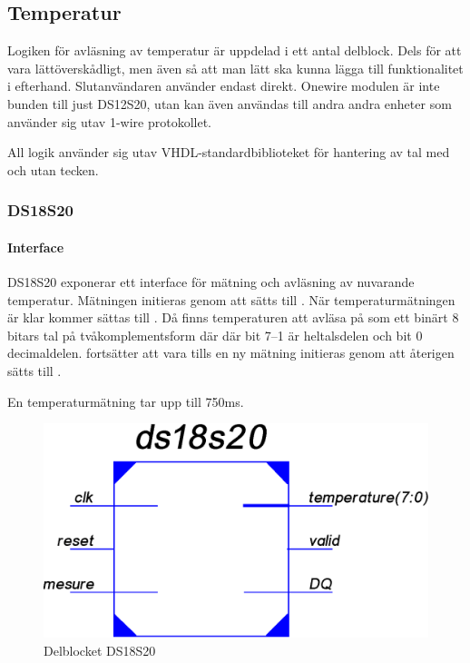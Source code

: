 
\subsection{Temperatur}\label{sec:temperatur}
Logiken för avläsning av temperatur är uppdelad i ett antal delblock. Dels för att vara lättöverskådligt, men även så att man lätt ska kunna lägga till funktionalitet i efterhand. Slutanvändaren använder endast  direkt. Onewire modulen är inte bunden till just DS12S20, utan kan även användas till andra andra enheter som använder sig utav 1-wire protokollet.

All logik använder sig utav VHDL-standardbiblioteket  för hantering av tal med och utan tecken.

\subsubsection{DS18S20}\label{sec:ds18s20}
\paragraph{Interface}
DS18S20 exponerar ett interface för mätning och avläsning av nuvarande temperatur. Mätningen initieras genom att  sätts till . När temperaturmätningen är klar kommer  sättas till .
Då finns temperaturen att avläsa på  som ett binärt 8 bitars tal på tvåkomplementsform där där bit 7--1 är heltalsdelen och bit 0 decimaldelen.
 fortsätter att vara  tills en ny mätning initieras genom att  återigen sätts till .

En temperaturmätning tar upp till 750ms.
\begin{figure}[htp]
\centering
\includegraphics[scale=0.5]{ds18s20_sch.eps}
\caption{Delblocket DS18S20}
\end{figure}

